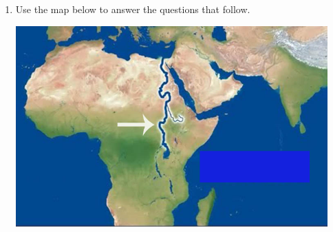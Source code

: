 \documentclass{article}
\begin{document}
\begin{enumerate}
\hfill\raggedright (1 mark) 
\vspace{5pt}
\hline
\vspace{7pt}

(b) What is the range in Chemutai’s marks?

\vspace{30pt}
\hspace{15cm} .......... 
\vspace{5pt}

\hfill\raggedright (1 mark) 
\vspace{5pt}
\hline
\vspace{7pt}

(c) What is the mean of Chemutai’s marks?

\vspace{100pt}
\hspace{15cm} .......... 
\vspace{5pt}

\hfill\raggedright (1 mark) 
\vspace{5pt}
\hline
\vspace{7pt}

(d) What is the median of Chemutai’s marks?

\vspace{120pt}
\hspace{15cm} .......... 
\vspace{5pt}

\hfill\raggedright (1 mark) 
\vspace{5pt}
\hline
\vspace{7pt}

\item Use the map below to answer the questions that follow. 

\begin{center}
    \includegraphics[width=12cm]{Exams/Nile_2.png}
\end{center}


\end{enumerate}
\end{document}
